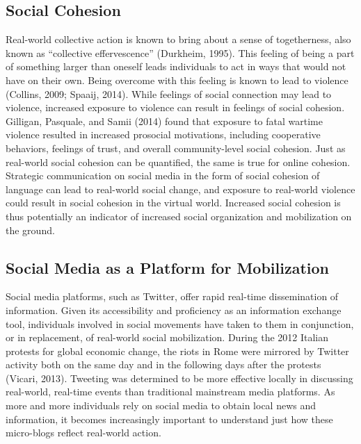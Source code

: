 \documentclass[english,man]{apa6}
\begin{document}
\hypertarget{social-cohesion}{%
\subsection{Social Cohesion}\label{social-cohesion}}

Real-world collective action is known to bring about a sense of togetherness, also known as \enquote{collective effervescence} (Durkheim, 1995). This feeling of being a part of something larger than oneself leads individuals to act in ways that would not have on their own. Being overcome with this feeling is known to lead to violence (Collins, 2009; Spaaij, 2014). While feelings of social connection may lead to violence, increased exposure to violence can result in feelings of social cohesion. Gilligan, Pasquale, and Samii (2014) found that exposure to fatal wartime violence resulted in increased prosocial motivations, including cooperative behaviors, feelings of trust, and overall community-level social cohesion. Just as real-world social cohesion can be quantified, the same is true for online cohesion. Strategic communication on social media in the form of social cohesion of language can lead to real-world social change, and exposure to real-world violence could result in social cohesion in the virtual world. Increased social cohesion is thus potentially an indicator of increased social organization and mobilization on the ground.

\hypertarget{social-media-as-a-platform-for-mobilization}{%
\subsection{Social Media as a Platform for Mobilization}\label{social-media-as-a-platform-for-mobilization}}

Social media platforms, such as Twitter, offer rapid real-time dissemination of information. Given its accessibility and proficiency as an information exchange tool, individuals involved in social movements have taken to them in conjunction, or in replacement, of real-world social mobilization. During the 2012 Italian protests for global economic change, the riots in Rome were mirrored by Twitter activity both on the same day and in the following days after the protests (Vicari, 2013). Tweeting was determined to be more effective locally in discussing real-world, real-time events than traditional mainstream media platforms. As more and more individuals rely on social media to obtain local news and information, it becomes increasingly important to understand just how these micro-blogs reflect real-world action.
\end{document}
